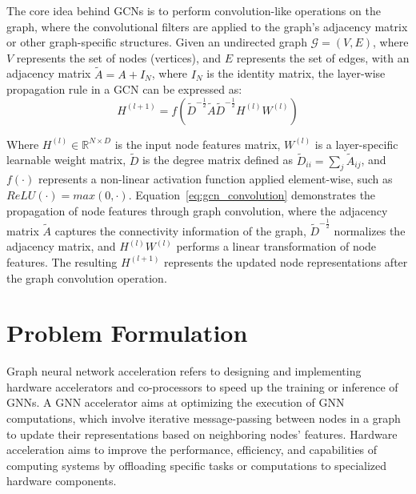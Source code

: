 \documentclass[11pt,a4paper,twocolumn]{article}
\begin{document}
The core idea behind GCNs is to perform convolution-like operations on the graph, where the convolutional filters are applied to the graph's adjacency matrix or other graph-specific structures.
Given an undirected graph $\mathcal{G} = (V, E)$, where $V$ represents the set of nodes (vertices), and $E$ represents the set of edges, with an adjacency matrix $\tilde{A}=A+I_N$, where $I_N$ is the identity matrix, the layer-wise propagation rule in a GCN can be expressed as:
\begin{equation}
    \label{eq:gcn_convolution}
    H^{(l+1)} = f \left( \tilde{D}^{-\tfrac{1}{2}}  \tilde{A}  \tilde{D}^{-\tfrac{1}{2}}  H^{(l)}  W^{(l)} \right)
\end{equation}

Where $H^{(l)} \in \mathbb{R} ^{N \times D}$ is the input node features matrix, $W^{(l)}$ is a layer-specific learnable weight matrix, $\tilde{D}$ is the degree matrix defined as $\tilde{D}_{ii} = \sum_{j} \tilde{A}_{ij}$, and $f(\cdot)$ represents a non-linear activation function applied element-wise, such as $ReLU(\cdot) = max(0, \cdot)$.
Equation~\ref{eq:gcn_convolution} demonstrates the propagation of node features through graph convolution, where the adjacency matrix $\tilde{A}$ captures the connectivity information of the graph, $\tilde{D}^{-\tfrac{1}{2}}$ normalizes the adjacency matrix, and $H^{(l)}  W^{(l)}$ performs a linear transformation of node features.
The resulting $H^{(l+1)}$ represents the updated node representations after the graph convolution operation.


\section{Problem Formulation}
\label{sec:problem-formulation}%

Graph neural network acceleration refers to designing and implementing hardware accelerators and co-processors to speed up the training or inference of GNNs.
A GNN accelerator aims at optimizing the execution of GNN computations, which involve iterative message-passing between nodes in a graph to update their representations based on neighboring nodes' features.
Hardware acceleration aims to improve the performance, efficiency, and capabilities of computing systems by offloading specific tasks or computations to specialized hardware components.
\end{document}
